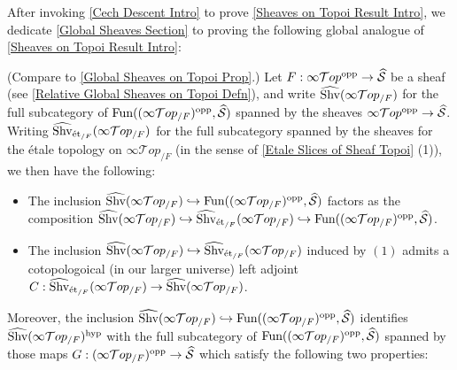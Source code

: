 \documentclass[10pt]{article}
\newcommand{\mS}{\mathcal S}
\newcommand{\cT}{\mathcal{T}}
\theoremstyle{witharg}
\theoremstyle{witharg}
\theoremstyle{witharg2}
\begin{document}
\noindent After invoking \ref{Cech Descent Intro} to prove \ref{Sheaves on Topoi Result Intro}, we dedicate \ref{Global Sheaves Section} to proving the following global analogue of \ref{Sheaves on Topoi Result Intro}:


\begin{proposition}{}\label{Global Sheaves on Topoi Prop Intro}

   (Compare to \ref{Global Sheaves on Topoi Prop}.) Let $F:\infty\cT op^{\textnormal{opp}}\rightarrow \widehat{\mS}$ be a sheaf (see  \ref{Relative Global Sheaves on Topoi Defn}), and write $\widehat{\textnormal{Shv}}(\infty\cT op_{/F})$ for the full subcategory of $\textnormal{Fun}((\infty\cT op_{/F})^{\textnormal{opp}},\widehat{\mS})$ spanned by the sheaves $\infty\cT op^{\textnormal{opp}}\rightarrow \widehat{\mS}$. Writing $\widehat{\textnormal{Shv}}_{\textnormal{\'{e}t}_{/F}}(\infty\cT op_{/F})$ for the full subcategory spanned by the sheaves for the \'{e}tale topology on $\infty\cT op_{/F}$ (in the sense of \ref{Etale Slices of Sheaf Topoi} (1)), we then have the following:

    \begin{itemize}
    
        \item [$(1)$] The inclusion $\widehat{\textnormal{Shv}}(\infty\cT op_{/F})\hookrightarrow \textnormal{Fun}((\infty\cT op_{/F})^{\textnormal{opp}},\widehat{\mS})$ factors as the composition $\widehat{\textnormal{Shv}}(\infty\cT op_{/F})\hookrightarrow \widehat{\textnormal{Shv}}_{\textnormal{\'{e}t}_{/F}}(\infty\cT op_{/F})\hookrightarrow \textnormal{Fun}((\infty\cT op_{/F})^{\textnormal{opp}},\widehat{\mS})$. 

        \item [$(2)$] The inclusion $\widehat{\textnormal{Shv}}(\infty\cT op_{/F})\hookrightarrow \widehat{\textnormal{Shv}}_{\textnormal{\'{e}t}_{/F}}(\infty\cT op_{/F})$ induced by $(1)$ admits a cotopologoical (in our larger universe) left adjoint $C:\widehat{\textnormal{Shv}}_{\textnormal{\'{e}t}_{/F}}(\infty\cT op_{/F})\rightarrow \widehat{\textnormal{Shv}}(\infty\cT op_{/F})$. 
        
    \end{itemize}

    \noindent Moreover, the inclusion $\widehat{\textnormal{Shv}}(\infty\cT op_{/F})\hookrightarrow \textnormal{Fun}((\infty\cT op_{/F})^{\textnormal{opp}},\widehat{\mS})$ identifies $\widehat{\textnormal{Shv}}(\infty\cT op_{/F})^{\textnormal{hyp}}$ with the full subcategory of $\textnormal{Fun}((\infty\cT op_{/F})^{\textnormal{opp}},\widehat{\mS})$ spanned by those maps $G:(\infty\cT op_{/F})^{\textnormal{opp}}\rightarrow \widehat{\mS}$ which satisfy the following two properties:


\end{proposition}
\end{document}
